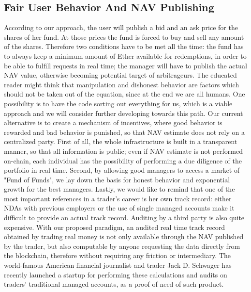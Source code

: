 \documentclass[9pt,oneside]{amsart}
\begin{document}
\begin{multicols}{2}
\subsection{Fair User Behavior And NAV Publishing}
According to our approach, the user will publish a bid and an ask price for the shares of her fund. At those prices the fund is forced to buy and sell any amount of the shares. Therefore two conditions have to be met all the time: the fund has to always keep a minimum amount of Ether available for redemptions, in order to be able to fulfill requests in real time; the manager will have to publish the actual NAV value, otherwise becoming potential target of arbitrageurs.
The educated reader might think that manipulation and dishonest behavior are factors which should not be taken out of the equation, since at the end we are all humans. One possibility is to have the code sorting out everything for us, which is a viable approach and we will consider further developing towards this path. Our current alternative is to create a mechanism of incentives, where good behavior is rewarded and bad behavior is punished, so that NAV estimate does not rely on a centralized party. First of all, the whole infrastructure is built in a transparent manner, so that all information is public; even if NAV estimate is not performed on-chain, each individual has the possibility of performing a due diligence of the portfolio in real time. 
Second, by allowing good managers to access a market of "Fund of Funds", we lay down the basis for honest behavior and exponential growth for the best managers.
Lastly, we would like to remind that one of the most important references in a trader's career is her own track record: either NDAs with previous employers or the use of single managed accounts make it difficult to provide an actual track record. Auditing by a third party is also quite expensive. With our proposed paradigm, an audited real time track record obtained by trading real money is not only available through the NAV published by the trader, but also computable by anyone requesting the data directly from the blockchain, therefore without requiring any friction or intermediary. The world-famous American financial journalist and trader Jack D. Schwager has recently launched a startup for performing these calculations and audits on traders' traditional managed accounts, as a proof of need of such product.


\end{multicols}
\end{document}
